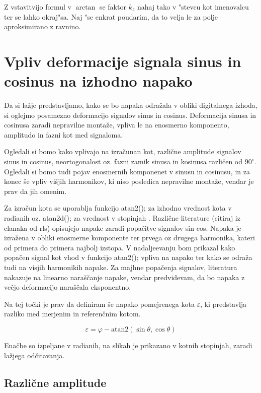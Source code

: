 Z vstavitvijo formul v $\arctan$ se faktor $k_z$ nahaj tako v "stevcu kot imenovalcu ter se lahko okraj"sa. Naj "se  enkrat poudarim, da to velja le za polje aproksimirano z ravnino.



\chapter{Vpliv deformacije signala sinus in cosinus na izhodno napako}

Da si lažje predstavljamo, kako se bo napaka odražala v obliki digitalnega izhoda, si oglejmo posamezno deformacijo signalov sinus in cosinus. Deformacija sinusa in cosinusa zaradi nepravilne montaže, vpliva le na enosmerno komponento, amplitudo in fazni kot med signaloma.

Ogledali si bomo kako vplivajo na izračunan kot, različne amplitude signalov sinus in cosinus, neortogonalost oz. fazni zamik sinusa in kosinusa različen od $90^\circ$. Ogledali si bomo tudi pojav enosmernih komponenet v sinusu in cosinusu, in za konec še vpliv višjih harmonikov, ki niso posledica nepravilne montaže, vendar je prav da jih omenim.

Za izračun kota se uporablja funkcijo atan2(); za izhodno vrednost kota v radianih oz. atan2d(); za vrednost v stopinjah \cite{atan2Matlab}\cite{atan2dMatlab}. Različne literature (citiraj iz clanaka od rls) opisujejo napake zaradi popačitve signalov sin cos. Napaka je izražena v obliki enosmerne komponente ter prvega oz drugega harmonika, kateri od primera do primera najbolj izstopa. V nadaljeevanju bom prikazal kako popačen signal kot vhod v funkcijo atan2(); vpliva na napako ter kako se odraža tudi na visjih harmonikih napake. Za majhne popačenja signalov, literatura nakazuje na linearno naraščanje napake, vendar predvidevam, da bo napaka z večjo deformacijo naraščala eksponentno.

Na tej točki je prav da definiram še napako pomejrenega kota $\varepsilon$, ki predstavlja razliko med merjenim in referenčnim kotom.

\begin{equation}
\varepsilon = \varphi - \mathrm{atan2}(\sin{\theta},\cos{\theta})
\end{equation}

Enačbe so izpeljane v radianih, na slikah je prikazano v kotnih stopinjah, zaradi lažjega odčitavanja.

\section{Različne amplitude}

